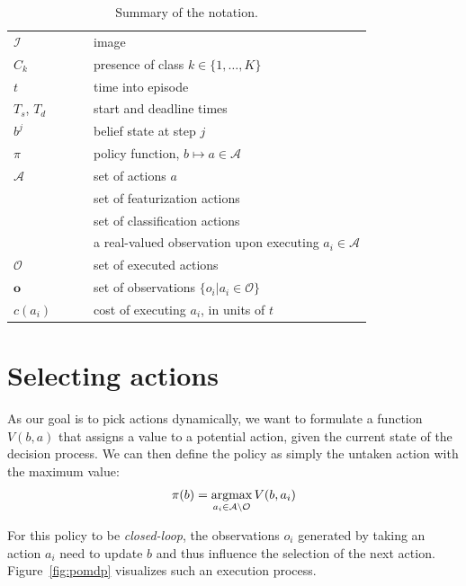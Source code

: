 \begin{table}[h!]
\centering
\caption{Summary of the notation.}
\label{tab:notation}
\begin{tabular}{|l|l|}
  \hline
  $\mathcal{I}$ & image \\
  $C_k$         & presence of class $k \in \{1,\dots,K\}$ \\ 
  $t$           & time into episode \\ 
  $T_s$, $T_d$  & start and deadline times \\ 
  $b^j$         & belief state at step $j$ \\ 
  $\pi$         & policy function, $b \mapsto a \in \mathcal{A}$ \\
  $\mathcal{A}$ & set of actions $a$\\ 
  \comment{$\mathcal{F}$ & set of featurization actions \\}
  \comment{$\mathcal{L}$ & set of classification actions\\}
  $o_i$         & a real-valued observation upon executing $a_i \in \mathcal{A}$\\
  $\mathcal{O}$ & set of executed actions\\
  $\mathbf{o}$  & set of observations $\{o_i | a_i \in \mathcal{O}\}$\\
  $c(a_i)$        & cost of executing $a_i$, in units of $t$\\
  \hline
\end{tabular}\end{table}

\section{Selecting actions} \label{sec:value}
As our goal is to pick actions dynamically, we want to formulate a function $V(b,a)$  that assigns a value to a potential action, given the current state of the decision process.
We can then define the policy as simply the untaken action with the maximum value:
\begin{align}
\pi(b) = \argmax_{a_i \in \mathcal{A} \setminus \mathcal{O}} V(b,a_i)
\end{align}

For this policy to be \emph{closed-loop}, the observations $o_i$ generated by taking an action $a_i$ need to update $b$ and thus influence the selection of the next action.
Figure~\ref{fig:pomdp} visualizes such an execution process.

